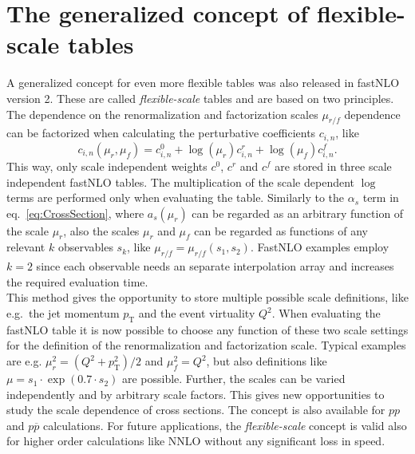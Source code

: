 \documentclass{DISproc}
\begin{document}


\section{The generalized concept of flexible-scale tables}

A generalized concept for even more flexible tables was also released
in fastNLO version 2.
These are called \emph{flexible-scale} tables and are based on two principles.\\
The dependence on the renormalization and factorization scales
$\mu_{r/f}$ dependence can be factorized when calculating the
perturbative coefficients $c_{i,n}$, like
\begin{equation}\label{eq:ScaleIndependentWeights}
  c_{i,n}(\mu_r,\mu_f) = c_{i,n}^0 + \log(\mu_r)c_{i,n}^r +  \log(\mu_f) c_{i,n}^f.
\end{equation}
This way, only scale independent weights $c^0$, $c^r$ and $c^f$ are
stored in three scale independent fastNLO tables.  The multiplication
of the scale dependent $\log$ terms are performed only when evaluating
the table.  Similarly to the $\alpha_s$ term in eq.\
\ref{eq:CrossSection}, where $a_s(\mu_r)$ can be regarded as an
arbitrary function of the scale $\mu_r$, also the scales $\mu_r$ and
$\mu_f$ can be regarded as functions of any relevant $k$ observables
$s_k$, like $\mu_{r/f} = \mu_{r/f}(s_1,s_2)$.
FastNLO examples employ $k=2$ since each observable needs an separate
interpolation array and increases the required evaluation time.\\
This method gives the opportunity to store multiple possible scale
definitions, like e.g.\ the jet momentum $p_\mathrm{T}$ and the event
virtuality $Q^2$.  When evaluating the fastNLO table it is now
possible to choose any function of these two scale settings for the
definition of the renormalization and factorization scale. Typical
examples are e.g. $\mu_r^2 = (Q^2+p^2_\mathrm{T})/2$ and $\mu_f^2 =
Q^2$, but also definitions like $\mu = s_1 \cdot \exp(0.7 \cdot s_2)$
are possible.  Further, the scales can be varied independently and by
arbitrary scale factors.  This gives new opportunities to study the
scale dependence of cross sections.  The concept is also available for
$pp$ and $p\overline{p}$ calculations.  For future applications, the
\emph{flexible-scale} concept is valid also for higher order
calculations like NNLO without any significant loss in speed.
\end{document}
